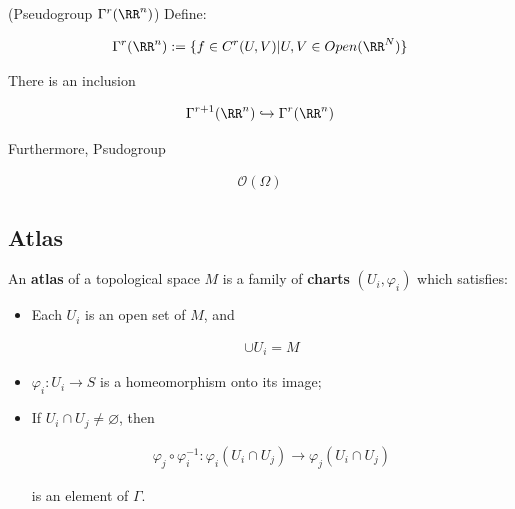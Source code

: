 \documentclass[Total.tex]{subfiles}
\begin{document}
				\begin{example}
					(Pseudogroup $\Gamma^r(\RR^n)$) Define:
					
					\begin{gather*}
						\Gamma^r(\RR^n):=\{f\in C^r(U,V)|U,V\in Open(\RR^N)\}
					\end{gather*}
					
					There is an inclusion
					
					\begin{gather*}
						\Gamma^{r+1}(\RR^n)\hookrightarrow \Gamma^{r}(\RR^n)
					\end{gather*}
				\end{example}
				
				\begin{example}
					Furthermore, Psudogroup
					
					\begin{gather*}
						\mathcal{O}(\Omega)
					\end{gather*}
				\end{example}
				
				\subsection{Atlas}
				
				\begin{Def}
					An \textbf{atlas} of a topological space $M$ is a family of \textbf{charts} $(U_i,\varphi_i)$ which satisfies:
					
					\begin{itemize}
						\item Each $U_i$ is an open set of $M$, and 
						
						\begin{gather*}
							\cup U_i=M
						\end{gather*}
						\item $\varphi_i:U_i\rightarrow S$ is a homeomorphism onto its image;
						\item If $U_i\cap U_j\not=\varnothing$, then
						
						\begin{gather*}
							\varphi_j\circ \varphi_i^{-1}:\varphi_i(U_i\cap U_j)\rightarrow \varphi_j(U_i\cap U_j)
						\end{gather*}
						
						is an element of $\Gamma$.
					\end{itemize}
				\end{Def}
				
\end{document}
